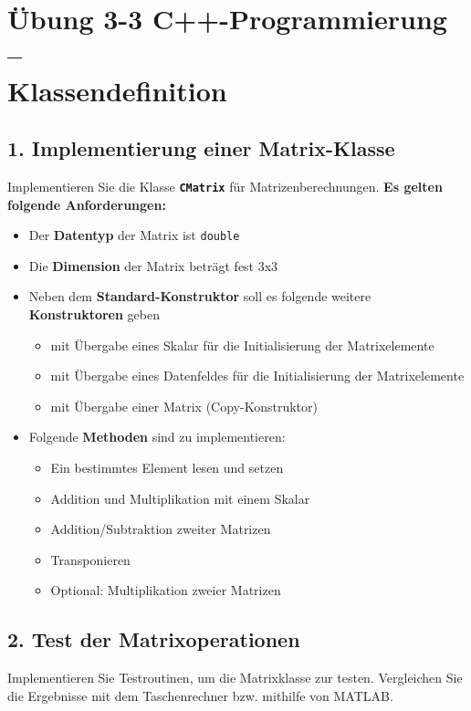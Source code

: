 \documentclass[
    fontsize=12pt,                      %
    paper=a4,                           %
    twoside=off,                       %
    DIV=15,                             %
    BCOR=12mm,                          %
    headings=normal,                    %
    headsepline=false,                   %
    footsepline=false,                  %
    headinclude=true,                   %
    footinclude=false,                  %
    toc=listof,                         %
    toc=bib,                            %
    chapterprefix=false,                %
    appendixprefix=false,               %
    numbers=noendperiod,                %
    captions=tableabove,                %
    footnotes=multiple,                 %
    bibliography=oldstyle,              %
    draft=false,                        %
]{scrreprt}
\newcommand{\Farbcode}[1]{\texttt{\textbf{\textcolor{myred}{#1}}}}
\begin{document}
\chapter*{Übung 3-3 C++-Programmierung -- \\Klassendefinition}

\section*{1. Implementierung einer Matrix-Klasse}
Implementieren Sie die Klasse \Farbcode{CMatrix} für Matrizenberechnungen. 
\vskip 0.2cm 
\noindent \textbf{Es gelten folgende Anforderungen:}
\begin{itemize}
\item Der \textbf{Datentyp} der Matrix ist \texttt{double}
\item Die \textbf{Dimension} der Matrix beträgt fest 3x3
\item Neben dem \textbf{Standard-Konstruktor} soll es folgende weitere \textbf{Konstruktoren} geben
\begin{itemize}
\item mit Übergabe eines Skalar für die Initialisierung der Matrixelemente
\item mit Übergabe eines Datenfeldes für die Initialisierung der Matrixelemente
\item mit Übergabe einer Matrix (Copy-Konstruktor)
\end{itemize}
\item Folgende \textbf{Methoden} sind zu implementieren:
\begin{itemize}
\item Ein bestimmtes Element lesen und setzen
\item Addition und Multiplikation mit einem Skalar
\item Addition/Subtraktion zweiter Matrizen 
\item Transponieren 
\item Optional: Multiplikation zweier Matrizen

\end{itemize}
\end{itemize}
 
\vskip 1cm

\section*{2. Test der Matrixoperationen}
Implementieren Sie Testroutinen, um die Matrixklasse zur testen. Vergleichen Sie die Ergebnisse mit dem Taschenrechner bzw. mithilfe von MATLAB.  
\newpage
\end{document}
